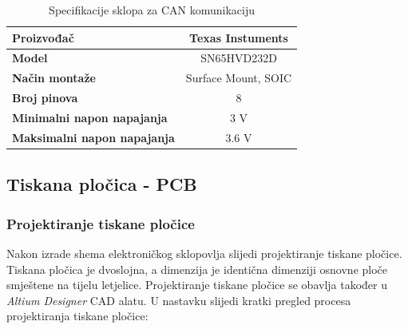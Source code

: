 \documentclass[11pt,a4paper]{article}
\begin{document}
\begin{table}[H]
	\centering
	\caption{Specifikacije sklopa za CAN komunikaciju}
	\label{tab:specifikacija_CAN_bus}
	\begin{tabular}{|l|c|}
		\hline
		\textbf{Proizvođač} & Texas Instuments \\ \hline 
		\textbf{Model} &  SN65HVD232D \\ \hline 
		\textbf{Način montaže} & Surface Mount, SOIC \\ \hline 
		\textbf{Broj pinova} & 8 \\ \hline 
		\textbf{Minimalni napon napajanja} & 3 V \\ \hline 
		\textbf{Maksimalni napon napajanja} & 3.6 V    \\ \hline
	\end{tabular}
\end{table}

\subsection{Tiskana pločica - PCB}

\subsubsection{Projektiranje tiskane pločice}
Nakon izrade shema elektroničkog sklopovlja slijedi projektiranje tiskane pločice. Tiskana pločica je dvoslojna, a dimenzija je identična dimenziji osnovne ploče smještene na tijelu letjelice. Projektiranje tiskane pločice se obavlja također u \textit{Altium Designer} CAD alatu. U nastavku slijedi kratki pregled procesa projektiranja tiskane pločice:
\end{document}

